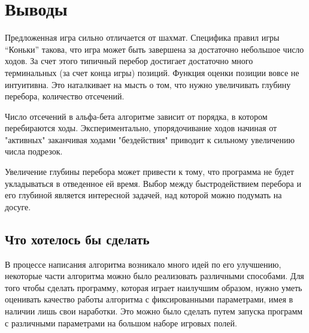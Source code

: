 \documentclass[a4paper]{article}
\begin{document}


\section{Выводы}

Предложенная игра сильно отличается от шахмат. Специфика правил игры ``Коньки'' такова, что игра может быть завершена за достаточно небольшое число ходов. За счет этого типичный перебор достигает достаточно много терминальных (за счет конца игры) позиций. Функция оценки позиции вовсе не интуитивна. Это наталкивает на мысть о том, что нужно увеличивать глубину перебора, количество отсечений.

Число отсечений в альфа-бета алгоритме зависит от порядка, в котором перебираются ходы. Экспериментально, упорядочивание ходов начиная от "активных" заканчивая ходами "бездействия" приводит к сильному увеличению числа подрезок.

Увеличение глубины перебора может привести к тому, что программа не будет укладываться в отведенное ей время. Выбор между быстродействием перебора и его глубиной является интересной задачей, над которой можно подумать на досуге.

\subsection{Что хотелось бы сделать}

В процессе написания алгоритма возникало много идей по его улучшению, некоторые части алгоритма можно было реализовать различными способами. Для того чтобы сделать программу, которая играет наилучшим образом, нужно уметь оценивать качество работы алгоритма с фиксированными параметрами, имея в наличии лишь свои наработки. Это можно было сделать путем запуска программ с различными параметрами на большом наборе игровых полей.
\end{document}
